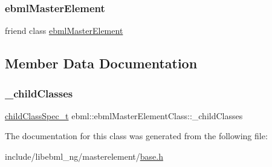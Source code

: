 \subsubsection{\texorpdfstring{ebml\+Master\+Element}{ebmlMasterElement}}
{\footnotesize\ttfamily friend class \mbox{\hyperlink{classebml_1_1ebmlMasterElement}{ebml\+Master\+Element}}\hspace{0.3cm}{\ttfamily [friend]}}



\subsection{Member Data Documentation}
\mbox{\label{classebml_1_1ebmlMasterElementClass_a2281bbfd89c6c3201c1b778efd428cb7}} 
\subsubsection{\texorpdfstring{\+\_\+child\+Classes}{\_childClasses}}
{\footnotesize\ttfamily \mbox{\hyperlink{classebml_1_1childClassSpec__t}{child\+Class\+Spec\+\_\+t}} ebml\+::ebml\+Master\+Element\+Class\+::\+\_\+child\+Classes\hspace{0.3cm}{\ttfamily [protected]}}



The documentation for this class was generated from the following file\+:\begin{DoxyCompactItemize}
\item 
include/libebml\+\_\+ng/masterelement/\mbox{\hyperlink{base_8h}{base.\+h}}\end{DoxyCompactItemize}
